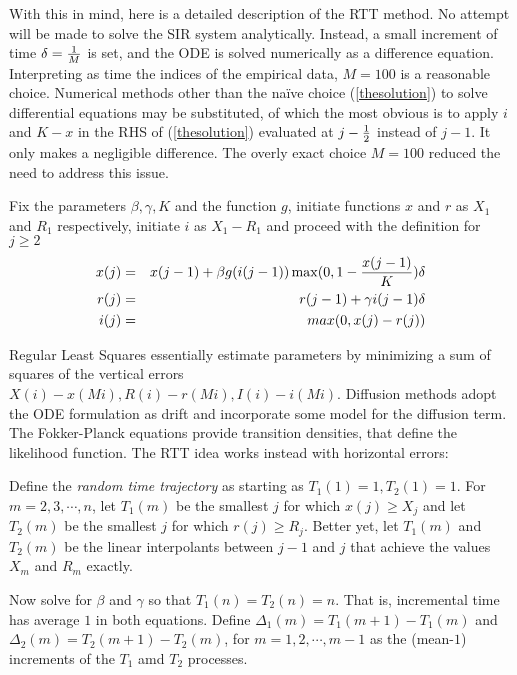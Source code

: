 \documentclass{article}
\begin{document}
With this in mind, here is a detailed description of the RTT method. No attempt will be made to solve the SIR system analytically. Instead, a small increment of time $\delta={1 \over M}$ is set, and the ODE is solved numerically as a difference equation. Interpreting as time the indices of the empirical data, $M=100$ is a reasonable choice. Numerical methods other than the na\"{i}ve choice (\ref{thesolution}) to solve differential equations may be substituted, of which the most obvious is to apply $i$ and $K-x$ in the RHS of (\ref{thesolution}) evaluated at $j-{1 \over 2}$ instead of $j-1$. It only makes a negligible difference. The overly exact choice $M=100$ reduced the need to address this issue.

\bigskip

Fix the parameters $\beta, \gamma, K$ and the function $g$, initiate functions $x$ and $r$ as $X_1$ and $R_1$ respectively, initiate $i$ as $X_1-R_1$ and proceed with the definition for $j \ge 2$
\begin{eqnarray}
x(j)&=&x(j-1)+\beta g(i(j-1))\max(0,1-{{x(j-1)} \over K}) \delta \nonumber \\
r(j)&=&r(j-1)+\gamma i(j-1) \delta \nonumber \\
i(j)&=&max(0,x(j)-r(j)) \label{thesolution}
\end{eqnarray}

Regular Least Squares essentially estimate parameters by minimizing a sum of squares of the vertical errors $X(i)-x(M i), R(i)-r(M i), I(i)-i(M i)$. Diffusion methods adopt the ODE formulation as drift and incorporate some model for the diffusion term. The Fokker-Planck equations provide transition densities, that define the likelihood function.
The RTT idea works instead with horizontal errors:

\bigskip

Define the {\em random time trajectory} as starting as $T_1(1)=1, T_2(1)=1$. For $m=2,3,\cdots,n$, let $T_1(m)$ be the smallest $j$ for which $x(j) \ge X_j$ and let $T_2(m)$ be the smallest $j$ for which $r(j) \ge R_j$. Better yet, let $T_1(m)$ and $T_2(m)$ be the linear interpolants between $j-1$ and $j$ that achieve the values $X_m$ and $R_m$ exactly.

Now solve for $\beta$ and $\gamma$ so that $T_1(n)=T_2(n)=n$. That is, incremental time has average $1$ in both equations. Define $\Delta_1(m)=T_1(m+1)-T_1(m)$ and $\Delta_2(m)=T_2(m+1)-T_2(m)$, for $m=1, 2, \cdots,m-1$ as the (mean-$1$) increments of the $T_1$ amd $T_2$ processes.
\end{document}
